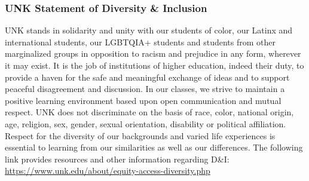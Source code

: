 \documentclass[12pt]{article}
\newcounter{on}\setcounter{on}{0}
\newcounter{ex}\setcounter{ex}{0}
\begin{document}
\subsubsection*{UNK Statement of Diversity \& Inclusion}

UNK stands in solidarity and unity with our students of color, our Latinx and international students, our LGBTQIA+ students 
and students from other marginalized groups in opposition to racism 
and prejudice in any form, wherever it may exist. It is the job of 
institutions of higher education, indeed their duty, to provide a 
haven for the safe and meaningful exchange of ideas and to support 
peaceful disagreement and discussion. In our classes, we strive to 
maintain a positive learning environment based upon open 
communication and mutual respect. UNK does not discriminate on the 
basis of race, color, national origin, age, religion, sex, gender, 
sexual orientation, disability or political affiliation. 
Respect for the diversity of our backgrounds and varied life 
experiences is essential to learning from our similarities as well 
as our differences. The following link provides resources and other 
information regarding D\&I: \url{https://www.unk.edu/about/equity-access-diversity.php}

%
%
\end{document}
